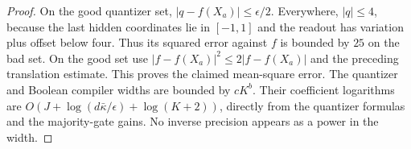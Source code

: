 \begin{proof}
On the good quantizer set, $|q-f(X_a)|\le\epsilon/2$.  Everywhere,
$|q|\le4$, because the last hidden coordinates lie in $[-1,1]$ and the
readout has variation plus offset below four.  Thus its squared error
against $f$ is bounded by $25$ on the bad set.  On the good set use
$|f-f(X_a)|^2\le2|f-f(X_a)|$ and the preceding translation estimate.
This proves the claimed mean-square error.  The quantizer and Boolean
compiler widths are bounded by $cK^b$.  Their coefficient logarithms
are $O(J+\log(d\bar\kappa/\epsilon)+\log(K+2))$, directly from the
quantizer formulas and the majority-gate gains.  No inverse precision
appears as a power in the width.
\end{proof}
